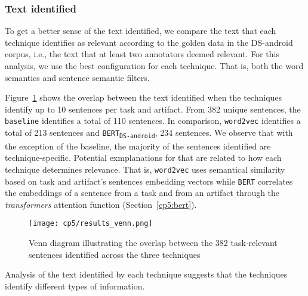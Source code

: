 

\subsubsection{Text identified}


To get a better sense of the text identified, we compare the text that each technique identifies as relevant according to the golden data in the \acs{DS-android} corpus, i.e., the text that at least two annotators deemed relevant. For this analysis, 
we use the best configuration for each technique. That is, both the word semantics and sentence semantic filters.



Figure~\ref{fig:text-overlap} shows the overlap between the text identified when the techniques identify up to 10 
sentences per task and artifact.
From 382 unique sentences, the \texttt{baseline} identifies a total of 110 sentences. In comparison, \texttt{word2vec} identifies a total of 213 sentences and \texttt{BERT\textsubscript{DS-android}}, 234 sentences. 
We observe that with the exception of the baseline, the majority of the sentences 
identified are technique-specific. Potential exmplanations for that are related to how each technique 
determines relevance. That is, \texttt{word2vec} uses semantical similarity based on task and artifact's sentences embedding vectors while 
\texttt{BERT} correlates the embeddings of a sentence from a task and from an artifact through the 
\textit{transformers} attention function (Section~\ref{cp5:bert}).




\begin{figure}
    \centering
    \texttt{[image: cp5/results\_venn.png]}
    \caption{Venn diagram illustrating the overlap between the 382 task-relevant sentences identified across the three techniques}
    \label{fig:text-overlap}
\end{figure}


Analysis of the text identified by each technique suggests that the techniques identify different types of information.











% 



